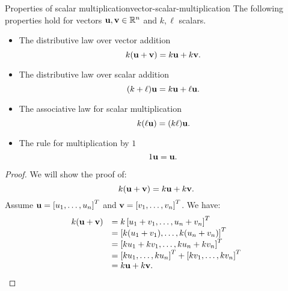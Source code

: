 \begin{proposition}{Properties of scalar multiplication}{vector-scalar-multiplication}
  The following properties hold for vectors
  $\vect{u},\vect{v}\in\R^n$ and $k,\ell$ scalars.%
  \begin{itemize}
  \item The distributive law over vector addition
    \begin{equation*}
      k(\vect{u} + \vect{v}) = k\vect{u} + k\vect{v}.
    \end{equation*}
  \item The distributive law over scalar addition
    \begin{equation*}
      (k + \ell) \vect{u} = k\vect{u} + \ell\vect{u}.
    \end{equation*}
  \item The associative law for scalar multiplication
    \begin{equation*}
      k(\ell\vect{u}) = (k\ell)\vect{u}.
    \end{equation*}
  \item The rule for multiplication by $1$
    \begin{equation*}
      1\vect{u}=\vect{u}.
    \end{equation*}
  \end{itemize}
\end{proposition}

\begin{proof}
  We will show the proof of:
  \begin{equation*}
    k(\vect{u} + \vect{v}) = k\vect{u} + k\vect{v}.
  \end{equation*}
  Assume $\vect{u}=\mat{u_1,\ldots,u_n}^T$ and
  $\vect{v}=\mat{v_1,\ldots,v_n}^T$. We have:
  \begin{equation*}
    \begin{array}{ll}
      k(\vect{u} + \vect{v}) & = k\mat{u_1 + v_1,\ldots,u_n + v_n}^T \\
                             & = \mat{k(u_1 + v_1), \ldots, k(u_n + v_n)}^T \\
                             & = \mat{ku_1 + k v_1, \ldots, ku_n + kv_n}^T \\
                             & = \mat{ku_1, \ldots, ku_n}^T + \mat{kv_1, \ldots, kv_n}^T \\
                             & = k\vect{u} + k\vect{v}.
    \end{array}
  \end{equation*}
\end{proof}

